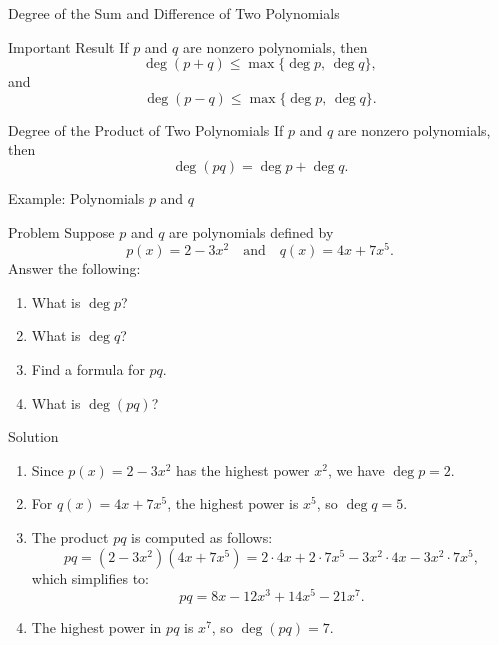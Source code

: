 \documentclass{beamer}
\begin{document}
\begin{frame}{Degree of the Sum and Difference of Two Polynomials}
  \begin{alertblock}{Important Result}
  If \(p\) and \(q\) are nonzero polynomials, then
  \[
  \deg(p+q) \leq \max\{\deg p,\, \deg q\},
  \]
  and
  \[
  \deg(p-q) \leq \max\{\deg p,\, \deg q\}.
  \]
  \end{alertblock}

 
  \begin{alertblock}{Degree of the Product of Two Polynomials}
    If \(p\) and \(q\) are nonzero polynomials, then
    \[
    \deg(pq) = \deg p + \deg q.
    \]
  \end{alertblock}
\end{frame}


\begin{frame}{Example: Polynomials \(p\) and \(q\)}
  \begin{exampleblock}{Problem}
  Suppose \(p\) and \(q\) are polynomials defined by
  \[
  p(x) = 2 - 3x^2 \quad \text{and} \quad q(x) = 4x + 7x^5.
  \]
  Answer the following:
  \begin{enumerate}
      \item What is \(\deg p\)?
      \item What is \(\deg q\)?
      \item Find a formula for \(pq\).
      \item What is \(\deg(pq)\)?
  \end{enumerate}
  \end{exampleblock}
\end{frame} 
\begin{frame}
  \begin{exampleblock}{Solution}
  \begin{enumerate}
      \item Since \(p(x) = 2 - 3x^2\) has the highest power \(x^2\), we have \(\deg p = 2\).
      \item For \(q(x) = 4x + 7x^5\), the highest power is \(x^5\), so \(\deg q = 5\).
      \item The product \(pq\) is computed as follows:
      \[
      pq = (2-3x^2)(4x+7x^5) = 2\cdot 4x + 2\cdot 7x^5 - 3x^2\cdot 4x - 3x^2\cdot 7x^5,
      \]
      which simplifies to:
      \[
      pq = 8x - 12x^3 + 14x^5 - 21x^7.
      \]
      \item The highest power in \(pq\) is \(x^7\), so \(\deg(pq) = 7\).
  \end{enumerate}
  \end{exampleblock}
  \end{frame}
\end{document}
